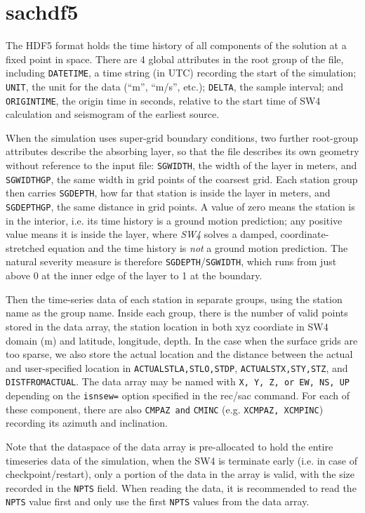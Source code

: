 \documentclass[11pt]{report}
\begin{document}
{\section{sachdf5}\label{sec:sachdf5-format}

The HDF5 format holds the time history of all components of the solution at a fixed point in space.
There are 4 global attributes in the root group of the file, including {\tt DATETIME}, a time string
(in UTC) recording the start of the simulation; {\tt UNIT}, the unit for the data (``m'', ``m/s'', etc.);
{\tt DELTA}, the sample interval; and {\tt ORIGINTIME}, the origin time in seconds, relative to the start time
of SW4 calculation and seismogram of the earliest source.

When the simulation uses super-grid boundary conditions, two further root-group attributes describe
the absorbing layer, so that the file describes its own geometry without reference to the input file:
{\tt SGWIDTH}, the width of the layer in meters, and {\tt SGWIDTHGP}, the same width in grid points of
the coarsest grid. Each station group then carries {\tt SGDEPTH}, how far that station is inside the
layer in meters, and {\tt SGDEPTHGP}, the same distance in grid points. A value of zero means the
station is in the interior, i.e. its time history is a ground motion prediction; any positive value
means it is inside the layer, where \emph{SW4} solves a damped, coordinate-stretched equation and the
time history is {\em not} a ground motion prediction. The natural severity measure is therefore
{\tt SGDEPTH}/{\tt SGWIDTH}, which runs from just above 0 at the inner edge of the layer to 1 at the
boundary.

Then the time-series data of each station in separate groups, using the station name as the group name.
Inside each group, there is the number of valid points stored in the data array, the station location
in both xyz coordiate in SW4 domain (m) and latitude, longitude, depth. In the case when the surface grids are too sparse, we also store the actual location and the distance between the actual and user-specified location in {\tt ACTUALSTLA,STLO,STDP}, {\tt ACTUALSTX,STY,STZ}, and  {\tt DISTFROMACTUAL}.  The data array may be named with
	{\tt X, Y, Z, or EW, NS, UP} depending on the {\tt isnsew=} option specified in the rec/sac command. For each of
these component, there are also {\tt *CMPAZ and} {\tt *CMINC} (e.g. {\tt XCMPAZ, XCMPINC}) recording its azimuth and inclination.

Note that the dataspace of the data array is pre-allocated to hold the entire timeseries data of the simulation,
when the SW4 is terminate early (i.e. in case of checkpoint/restart), only a portion of the data in the array
is valid, with the size recorded in the {\tt NPTS} field. When reading the data, it is recommended to read the
	{\tt NPTS} value first and only use the first {\tt NPTS} values from the data array.

}
\end{document}
